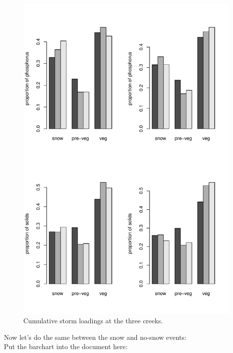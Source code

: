 \documentclass[12pt]{article}
\begin{document}
\begin{figure}
    \begin{center}
\includegraphics{loadings-fig2}
    \end{center}
    \caption{Cumulative storm loadings at the three creeks.\label{bars}}
\end{figure}



Now let's do the same between the snow and no-snow events:\\






Put the barchart into the document here:\\
\end{document}
